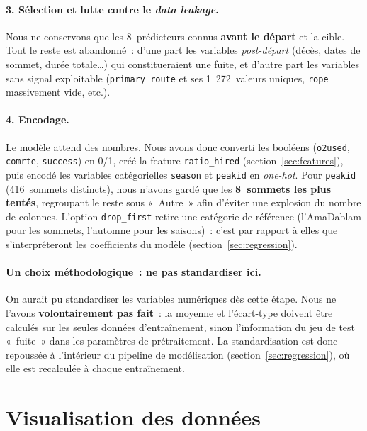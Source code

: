 \documentclass[11pt,a4paper]{article}
\begin{document}
\paragraph{3. Sélection et lutte contre le \textit{data leakage}.} Nous ne
conservons que les 8~prédicteurs connus \textbf{avant le départ} et la cible.
Tout le reste est abandonné~: d'une part les variables \textit{post-départ}
(décès, dates de sommet, durée totale\dots) qui constitueraient une fuite, et
d'autre part les variables sans signal exploitable (\texttt{primary\_route} et
ses 1~272~valeurs uniques, \texttt{rope} massivement vide, etc.).

\paragraph{4. Encodage.} Le modèle attend des nombres. Nous avons donc converti
les booléens (\texttt{o2used}, \texttt{comrte}, \texttt{success}) en 0/1, créé la
feature \texttt{ratio\_hired} (section~\ref{sec:features}), puis encodé les
variables catégorielles \texttt{season} et \texttt{peakid} en \textit{one-hot}.
Pour \texttt{peakid} (416~sommets distincts), nous n'avons gardé que les
\textbf{8~sommets les plus tentés}, regroupant le reste sous «~Autre~» afin
d'éviter une explosion du nombre de colonnes. L'option \texttt{drop\_first}
retire une catégorie de référence (l'AmaDablam pour les sommets, l'automne pour
les saisons)~: c'est par rapport à elles que s'interpréteront les coefficients du
modèle (section~\ref{sec:regression}).

\paragraph{Un choix méthodologique~: ne pas standardiser ici.} On aurait pu
standardiser les variables numériques dès cette étape. Nous ne l'avons
\textbf{volontairement pas fait}~: la moyenne et l'écart-type doivent être
calculés sur les seules données d'entraînement, sinon l'information du jeu de
test «~fuite~» dans les paramètres de prétraitement. La standardisation est donc
repoussée à l'intérieur du pipeline de modélisation (section~\ref{sec:regression}),
où elle est recalculée à chaque entraînement.

\section{Visualisation des données}
\end{document}
